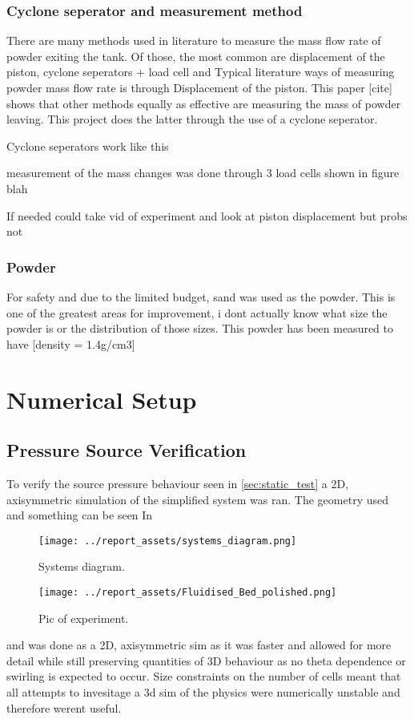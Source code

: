 \newpage


\newpage
\subsubsection{Cyclone seperator and measurement method}
There are many methods used in literature to measure the mass flow rate of powder exiting the tank. Of those, the most common are displacement of the piston, cyclone seperators + load cell and 
Typical literature ways of measuring powder mass flow rate is through Displacement of the piston. This paper [cite] shows that other methods equally as effective are measuring the mass of powder leaving. This project does the latter through the use of a cyclone seperator.

Cyclone seperators work like this

measurement of the mass changes was done through 3 load cells shown in figure blah

If needed could take vid of experiment and look at piston displacement but probs not


\subsubsection{Powder}
For safety and due to the limited budget, sand was used as the powder. This is one of the greatest areas for improvement, i dont actually know what size the powder is or the distribution of those sizes. This powder has been measured to have [density = 1.4g/cm3]

\newpage
\section{Numerical Setup}
\subsection{Pressure Source Verification}
To verify the source pressure behaviour seen in \autoref{sec:static_test} a 2D, axisymmetric simulation of the simplified system was ran. The geometry used and something can be seen In
\begin{figure}[htbp]
    \centering

    \begin{minipage}{0.95\textwidth}
        \centering
        \texttt{[image: ../report\_assets/systems\_diagram.png]}
        \caption{Systems diagram.}\label{fig:geometry_static_sim}
    \end{minipage}
    \hfill
    \begin{minipage}{0.45\textwidth}
        \centering
        \texttt{[image: ../report\_assets/Fluidised\_Bed\_polished.png]}
        \caption{Pic of experiment.}\label{fig:something_else}
    \end{minipage}

\end{figure}
and was done as a 2D, axisymmetric sim as it was faster and allowed for more detail while still preserving quantities of 3D behaviour as no theta dependence or swirling is expected to occur. Size constraints on the number of cells meant that all attempts to invesitage a 3d sim of the physics were numerically unstable and therefore werent useful.


